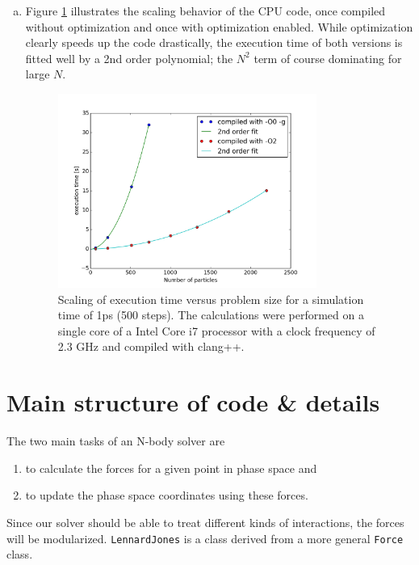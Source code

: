 \documentclass{scrartcl}
\begin{document}
\begin{enumerate}[a)]
\item Figure \ref{fig:scal} illustrates the scaling behavior of the CPU code,
    once compiled without optimization and once with optimization enabled.
    While optimization clearly speeds up the code drastically,
    the execution time of both versions is fitted well by a 2nd order 
    polynomial; the $N^2$ term of course dominating for large $N$.

\begin{figure}[h]
    \centering
    \includegraphics[width=0.80\textwidth]{images/scaling}
    \caption{Scaling of execution time versus problem size for a simulation
             time of 1ps (500 steps). 
             The calculations were performed on a single core of a Intel Core i7 
             processor with a clock frequency of 2.3 GHz and compiled with clang++.}
    \label{fig:scal}
\end{figure}

\end{enumerate}


\section{Main structure of code \& details}

The two main tasks of an N-body solver are
\begin{enumerate}
    \item to calculate the forces for a given point in phase space and 
    \item to update the phase space coordinates using these forces.
\end{enumerate}

Since our solver should be able to treat different kinds of interactions,
the forces will be modularized. \verb|LennardJones| is a class derived
from a more general \verb|Force|  class.
\end{document}
